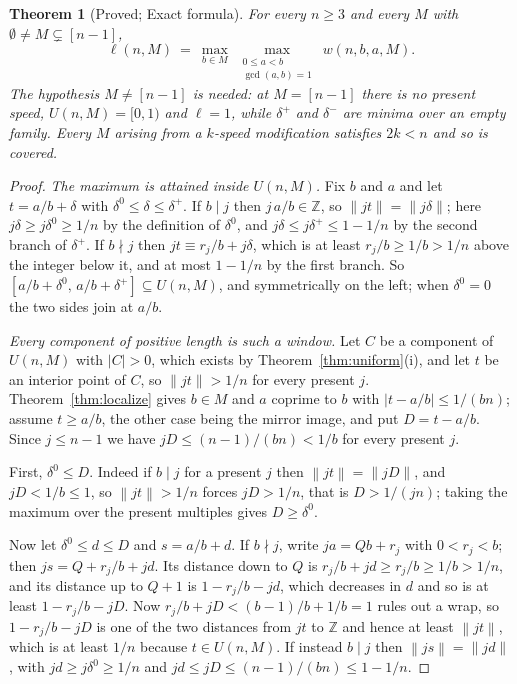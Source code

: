 \documentclass[11pt]{amsart}
\theoremstyle{plain}
\newtheorem{theorem}{Theorem}[section]
\theoremstyle{definition}
\newcommand{\nrm}[1]{\left\lVert #1 \right\rVert}
\newcommand{\Z}{\mathbb{Z}}
\begin{document}
\begin{theorem}[Proved; Exact formula]\label{thm:exact}
For every $n\ge3$ and every $M$ with $\emptyset\ne M\subsetneq[n-1]$,
\[
  \ell(n,M)\ =\ \max_{b\in M}\ \max_{\substack{0\le a<b\\ \gcd(a,b)=1}}\ w(n,b,a,M).
\]
The hypothesis $M\ne[n-1]$ is needed: at $M=[n-1]$ there is no present speed, $U(n,M)=[0,1)$ and
$\ell=1$, while $\delta^{+}$ and $\delta^{-}$ are minima over an empty family. Every $M$ arising
from a $k$-speed modification satisfies $2k<n$ and so is covered.
\end{theorem}

\begin{proof}
\emph{The maximum is attained inside $U(n,M)$.} Fix $b$ and $a$ and let $t=a/b+\delta$ with
$\delta^{0}\le\delta\le\delta^{+}$. If $b\mid j$ then $j\,a/b\in\Z$, so $\nrm{jt}=\nrm{j\delta}$;
here $j\delta\ge j\delta^{0}\ge 1/n$ by the definition of $\delta^{0}$, and $j\delta\le
j\delta^{+}\le 1-1/n$ by the second branch of $\delta^{+}$. If $b\nmid j$ then $jt\equiv
r_j/b+j\delta$, which is at least $r_j/b\ge1/b>1/n$ above the integer below it, and at most
$1-1/n$ by the first branch. So $[a/b+\delta^{0},\,a/b+\delta^{+}]\subseteq U(n,M)$, and symmetrically
on the left; when $\delta^{0}=0$ the two sides join at $a/b$.

\emph{Every component of positive length is such a window.} Let $C$ be a component of $U(n,M)$
with $|C|>0$, which exists by Theorem~\ref{thm:uniform}(i), and let $t$ be an interior
point of $C$, so $\nrm{jt}>1/n$ for every present $j$. Theorem~\ref{thm:localize} gives $b\in M$ and
$a$ coprime to $b$ with $|t-a/b|\le 1/(bn)$; assume $t\ge a/b$, the other case being the mirror
image, and put $D=t-a/b$. Since $j\le n-1$ we have $jD\le (n-1)/(bn)<1/b$ for every present $j$.

First, $\delta^{0}\le D$. Indeed if $b\mid j$ for a present $j$ then $\nrm{jt}=\nrm{jD}$, and
$jD<1/b\le1$, so $\nrm{jt}>1/n$ forces $jD>1/n$, that is $D>1/(jn)$; taking the maximum over the
present multiples gives $D\ge\delta^{0}$.

Now let $\delta^{0}\le d\le D$ and $s=a/b+d$. If $b\nmid j$, write $ja=Qb+r_j$ with $0<r_j<b$; then
$js=Q+r_j/b+jd$. Its distance down to $Q$ is $r_j/b+jd\ge r_j/b\ge1/b>1/n$, and its distance up to
$Q+1$ is $1-r_j/b-jd$, which decreases in $d$ and so is at least $1-r_j/b-jD$. Now
$r_j/b+jD<(b-1)/b+1/b=1$ rules out a wrap, so $1-r_j/b-jD$ is one of the two distances from $jt$ to
$\Z$ and hence at least $\nrm{jt}$, which is at least $1/n$ because $t\in U(n,M)$. If instead
$b\mid j$ then $\nrm{js}=\nrm{jd}$, with $jd\ge j\delta^{0}\ge1/n$ and
$jd\le jD\le (n-1)/(bn)\le 1-1/n$.


\end{proof}
\end{document}
